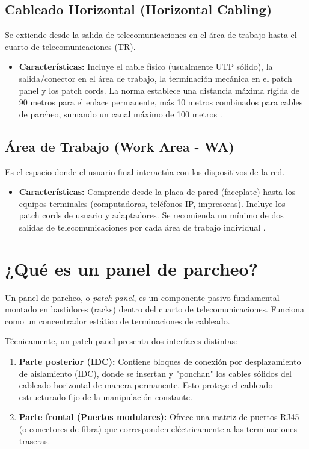 \documentclass[a4paper,12pt]{article}
\begin{document}
\subsection{Cableado Horizontal (Horizontal Cabling)}
Se extiende desde la salida de telecomunicaciones en el área de trabajo hasta el cuarto de telecomunicaciones (TR).
\begin{itemize}
    \item \textbf{Características:} Incluye el cable físico (usualmente UTP sólido), la salida/conector en el área de trabajo, la terminación mecánica en el patch panel y los patch cords. La norma establece una distancia máxima rígida de 90 metros para el enlace permanente, más 10 metros combinados para cables de parcheo, sumando un canal máximo de 100 metros \cite{ansi_tia}.
\end{itemize}

\subsection{Área de Trabajo (Work Area - WA)}
Es el espacio donde el usuario final interactúa con los dispositivos de la red.
\begin{itemize}
    \item \textbf{Características:} Comprende desde la placa de pared (faceplate) hasta los equipos terminales (computadoras, teléfonos IP, impresoras). Incluye los patch cords de usuario y adaptadores. Se recomienda un mínimo de dos salidas de telecomunicaciones por cada área de trabajo individual \cite{sysracks}.
\end{itemize}

\section{¿Qué es un panel de parcheo?}

Un panel de parcheo, o \textit{patch panel}, es un componente pasivo fundamental montado en bastidores (racks) dentro del cuarto de telecomunicaciones. Funciona como un concentrador estático de terminaciones de cableado.

Técnicamente, un patch panel presenta dos interfaces distintas:
\begin{enumerate}
    \item \textbf{Parte posterior (IDC):} Contiene bloques de conexión por desplazamiento de aislamiento (IDC), donde se insertan y "ponchan" los cables sólidos del cableado horizontal de manera permanente. Esto protege el cableado estructurado fijo de la manipulación constante.
    \item \textbf{Parte frontal (Puertos modulares):} Ofrece una matriz de puertos RJ45 (o conectores de fibra) que corresponden eléctricamente a las terminaciones traseras.
\end{enumerate}
\end{document}
